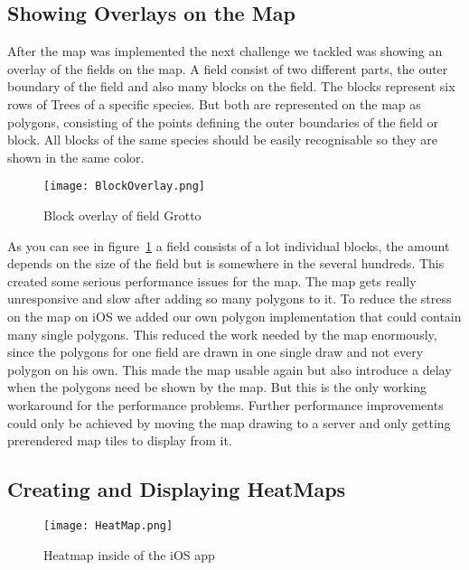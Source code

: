 \subsection{Showing Overlays on the Map}

After the map was implemented the next challenge we tackled was showing an overlay of the fields on the map. A field consist of two different parts, the outer boundary of the field and also many blocks on the field. The blocks represent six rows of Trees of a specific species. But both are represented on the map as polygons, consisting of the points defining the outer boundaries of the field or block. All blocks of the same species should be easily recognisable so they are shown in the same color.

\begin{figure}[h]
		\centering
		\texttt{[image: BlockOverlay.png]}
		\caption{Block overlay of field Grotto\label{fig:BlockOverlay}}
\end{figure}

As you can see in figure~\ref{fig:BlockOverlay} a field consists of a lot individual blocks, the amount depends on the size of the field but is somewhere in the several hundreds. This created some serious performance issues for the map. The map gets really unresponsive and slow after adding so many \glspl{polygon} to it. To reduce the stress on the map on iOS we added our own \gls{polygon} implementation that could contain many single \glspl{polygon}. This reduced the work needed by the map enormously, since the polygons for one field are drawn in one single draw and not every \gls{polygon} on his own. This made the map usable again but also introduce a delay when the polygons need be shown by the map. But this is the only working workaround for the performance problems. Further performance improvements could only be achieved by moving the map drawing to a server and only getting prerendered map tiles to display from it.


\subsection{Creating and Displaying HeatMaps}

\begin{figure}[h]
		\centering
		\texttt{[image: HeatMap.png]}
		\caption{Heatmap inside of the iOS app\label{fig:Heatmap}}

\end{figure}

